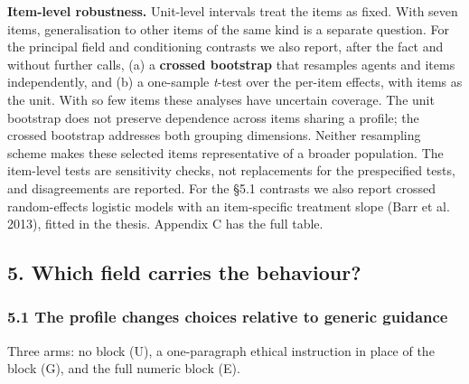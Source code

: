 \documentclass[
  11pt]{article}
\begin{document}
\textbf{Item-level robustness.} Unit-level intervals treat the items as
fixed. With seven items, generalisation to other items of the same kind
is a separate question. For the principal field and conditioning
contrasts we also report, after the fact and without further calls, (a)
a \textbf{crossed bootstrap} that resamples agents and items
independently, and (b) a one-sample \emph{t}-test over the per-item
effects, with items as the unit. With so few items these analyses have
uncertain coverage. The unit bootstrap does not preserve dependence
across items sharing a profile; the crossed bootstrap addresses both
grouping dimensions. Neither resampling scheme makes these selected
items representative of a broader population. The item-level tests are
sensitivity checks, not replacements for the prespecified tests, and
disagreements are reported. For the §5.1 contrasts we also report
crossed random-effects logistic models with an item-specific treatment
slope (Barr et al. 2013), fitted in the thesis. Appendix C has the full
table.

\subsection{5. Which field carries the
behaviour?}\label{which-field-carries-the-behaviour}

\subsubsection{5.1 The profile changes choices relative to generic
guidance}\label{the-profile-changes-choices-relative-to-generic-guidance}

Three arms: no block (U), a one-paragraph ethical instruction in place
of the block (G), and the full numeric block (E).
\end{document}
